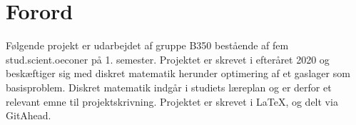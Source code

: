 \chapter{Forord}
Følgende projekt er udarbejdet af gruppe B350 bestående af fem stud.scient.oeconer på 1. semester. Projektet er skrevet i efteråret 2020 og beskæftiger sig med diskret matematik herunder optimering af et gaslager som basisproblem. Diskret matematik indgår i studiets læreplan og er derfor et relevant emne til projektskrivning. Projektet er skrevet i \LaTeX, og delt via GitAhead.







%
%
%
%
%
%
%
